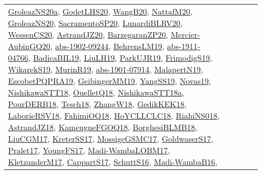 {\begin{longtable}{lp{3cm}>{\raggedright}p{6cm}>{\raggedright}p{6cm}p{8cm}}
\href{papers/GroleazNS20a.pdf}{GroleazNS20a}\cite{GroleazNS20a}, \href{papers/GodetLHS20.pdf}{GodetLHS20}\cite{GodetLHS20}, \href{papers/WangB20.pdf}{WangB20}\cite{WangB20}, \href{papers/NattafM20.pdf}{NattafM20}\cite{NattafM20}, \href{papers/GroleazNS20.pdf}{GroleazNS20}\cite{GroleazNS20}, \href{articles/SacramentoSP20.pdf}{SacramentoSP20}\cite{SacramentoSP20}, \href{articles/LunardiBLRV20.pdf}{LunardiBLRV20}\cite{LunardiBLRV20}, \href{papers/WessenCS20.pdf}{WessenCS20}\cite{WessenCS20}, \href{articles/AstrandJZ20.pdf}{AstrandJZ20}\cite{AstrandJZ20}, \href{papers/BarzegaranZP20.pdf}{BarzegaranZP20}\cite{BarzegaranZP20}, \href{papers/Mercier-AubinGQ20.pdf}{Mercier-AubinGQ20}\cite{Mercier-AubinGQ20}, \href{articles/abs-1902-09244.pdf}{abs-1902-09244}\cite{abs-1902-09244}, \href{papers/BehrensLM19.pdf}{BehrensLM19}\cite{BehrensLM19}, \href{articles/abs-1911-04766.pdf}{abs-1911-04766}\cite{abs-1911-04766}, \href{papers/BadicaBIL19.pdf}{BadicaBIL19}\cite{BadicaBIL19}, \href{papers/LiuLH19.pdf}{LiuLH19}\cite{LiuLH19}, \href{papers/ParkUJR19.pdf}{ParkUJR19}\cite{ParkUJR19}, \href{papers/FrimodigS19.pdf}{FrimodigS19}\cite{FrimodigS19}, \href{articles/WikarekS19.pdf}{WikarekS19}\cite{WikarekS19}, \href{papers/MurinR19.pdf}{MurinR19}\cite{MurinR19}, \href{articles/abs-1901-07914.pdf}{abs-1901-07914}\cite{abs-1901-07914}, \href{papers/MalapertN19.pdf}{MalapertN19}\cite{MalapertN19}, \href{articles/EscobetPQPRA19.pdf}{EscobetPQPRA19}\cite{EscobetPQPRA19}, \href{papers/GeibingerMM19.pdf}{GeibingerMM19}\cite{GeibingerMM19}, \href{papers/YangSS19.pdf}{YangSS19}\cite{YangSS19}, \href{articles/Novas19.pdf}{Novas19}\cite{Novas19}, \href{papers/NishikawaSTT18.pdf}{NishikawaSTT18}\cite{NishikawaSTT18}, \href{papers/OuelletQ18.pdf}{OuelletQ18}\cite{OuelletQ18}, \href{papers/NishikawaSTT18a.pdf}{NishikawaSTT18a}\cite{NishikawaSTT18a}, \href{articles/PourDERB18.pdf}{PourDERB18}\cite{PourDERB18}, \href{papers/Tesch18.pdf}{Tesch18}\cite{Tesch18}, \href{articles/ZhangW18.pdf}{ZhangW18}\cite{ZhangW18}, \href{articles/GedikKEK18.pdf}{GedikKEK18}\cite{GedikKEK18}, \href{articles/LaborieRSV18.pdf}{LaborieRSV18}\cite{LaborieRSV18}, \href{articles/FahimiOQ18.pdf}{FahimiOQ18}\cite{FahimiOQ18}, \href{papers/HoYCLLCLC18.pdf}{HoYCLLCLC18}\cite{HoYCLLCLC18}, \href{papers/RiahiNS018.pdf}{RiahiNS018}\cite{RiahiNS018}, \href{papers/AstrandJZ18.pdf}{AstrandJZ18}\cite{AstrandJZ18}, \href{papers/KameugneFGOQ18.pdf}{KameugneFGOQ18}\cite{KameugneFGOQ18}, \href{articles/BorghesiBLMB18.pdf}{BorghesiBLMB18}\cite{BorghesiBLMB18}, \href{papers/LiuCGM17.pdf}{LiuCGM17}\cite{LiuCGM17}, \href{articles/KreterSS17.pdf}{KreterSS17}\cite{KreterSS17}, \href{papers/MossigeGSMC17.pdf}{MossigeGSMC17}\cite{MossigeGSMC17}, \href{papers/GoldwaserS17.pdf}{GoldwaserS17}\cite{GoldwaserS17}, \href{papers/Pralet17.pdf}{Pralet17}\cite{Pralet17}, \href{papers/YoungFS17.pdf}{YoungFS17}\cite{YoungFS17}, \href{papers/Madi-WambaLOBM17.pdf}{Madi-WambaLOBM17}\cite{Madi-WambaLOBM17}, \href{papers/KletzanderM17.pdf}{KletzanderM17}\cite{KletzanderM17}, \href{papers/CappartS17.pdf}{CappartS17}\cite{CappartS17}, \href{papers/SchuttS16.pdf}{SchuttS16}\cite{SchuttS16}, \href{papers/Madi-WambaB16.pdf}{Madi-WambaB16}\cite{Madi-WambaB16}, 
\end{longtable}}
